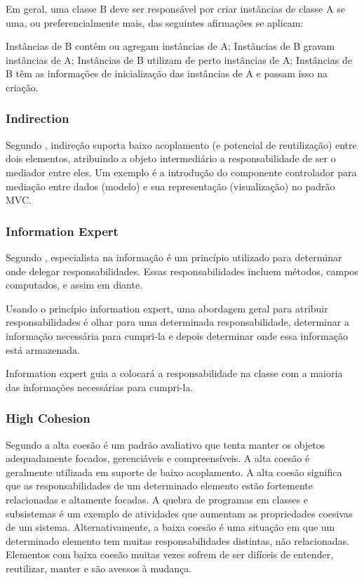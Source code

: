 \documentclass[12pt]{article}
\begin{document}
Em geral, uma classe B deve ser responsável por criar instâncias de classe A se uma, ou preferencialmente mais, das seguintes afirmações se aplicam:

Instâncias de B contêm ou agregam instâncias de A;
Instâncias de B gravam instâncias de A;
Instâncias de B utilizam de perto instâncias de A;
Instâncias de B têm as informações de inicialização das instâncias de A e passam isso na criação.

\subsubsection{Indirection} \label{sec:grasp}

Segundo \cite{CRAIG_LARMAN}, indireção suporta baixo acoplamento (e potencial de reutilização) entre dois elementos, atribuindo a objeto intermediário a responsabilidade de ser o mediador entre eles. Um exemplo é a introdução do componente controlador para mediação entre dados (modelo) e sua representação (visualização) no padrão MVC.

\subsubsection{Information Expert} \label{sec:grasp}
	
Segundo \cite{CRAIG_LARMAN}, especialista na informação é um princípio utilizado para determinar onde delegar responsabilidades. Essas responsabilidades incluem métodos, campos computados, e assim em diante.

Usando o princípio information expert, uma abordagem geral para atribuir responsabilidades é olhar para uma determinada responsabilidade, determinar a informação necessária para cumpri-la e depois determinar onde essa informação está armazenada.

Information expert guia a colocará a responsabilidade na classe com a maioria das informações necessárias para cumpri-la.

\subsubsection{High Cohesion} \label{sec:grasp}

Segundo \cite{CRAIG_LARMAN} a alta coesão é um padrão avaliativo que tenta manter os objetos adequadamente focados, gerenciáveis e compreensíveis. A alta coesão é geralmente utilizada em suporte de baixo acoplamento. A alta coesão significa que as responsabilidades de um determinado elemento estão fortemente relacionadas e altamente focadas. A quebra de programas em classes e subsistemas é um exemplo de atividades que aumentam as propriedades coesivas de um sistema. Alternativamente, a baixa coesão é uma situação em que um determinado elemento tem muitas responsabilidades distintas, não relacionadas. Elementos com baixa coesão muitas vezes sofrem de ser difíceis de entender, reutilizar, manter e são avessos à mudança.
\end{document}
